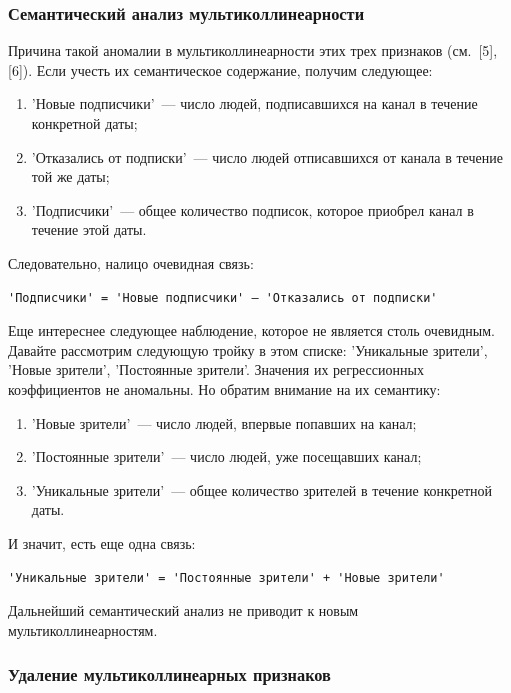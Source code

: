 \documentclass[a4paper,12pt]{article}
\begin{document}
\subsubsection{Семантический анализ мультиколлинеарности}

Причина такой аномалии в мультиколлинеарности этих трех признаков (см. [5], [6]). Если учесть их семантическое содержание, получим следующее:

\medskip\noindent
\begin{enumerate}
	\item 'Новые подписчики' — число людей, подписавшихся на канал в течение конкретной даты;
	\item 'Отказались от подписки' — число людей отписавшихся от канала в течение той же даты;
	\item 'Подписчики' — общее количество подписок, которое приобрел канал в течение этой даты.
\end{enumerate}

\medskip\noindent
Следовательно, налицо очевидная связь:
\begin{verbatim}
'Подписчики' = 'Новые подписчики' – 'Отказались от подписки'
\end{verbatim}
Еще интереснее следующее наблюдение, которое не является столь очевидным. Давайте рассмотрим следующую тройку в этом списке: 'Уникальные зрители', 'Новые зрители', 'Постоянные зрители'.
Значения их регрессионных коэффициентов не аномальны. Но обратим внимание на их семантику:

\medskip\noindent
\begin{enumerate}
	\item 'Новые зрители' — число людей, впервые попавших на канал;
	\item 'Постоянные зрители' — число людей, уже посещавших канал;
	\item 'Уникальные зрители' — общее количество зрителей в течение конкретной даты.
\end{enumerate}

\medskip\noindent
И значит, есть еще одна связь:
\begin{verbatim}
'Уникальные зрители' = 'Постоянные зрители' + 'Новые зрители'
\end{verbatim}
Дальнейший семантический анализ не приводит к новым мультиколлинеарностям.


\subsubsection{Удаление мультиколлинеарных признаков}
\end{document}
